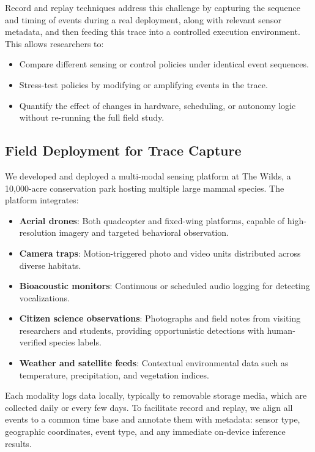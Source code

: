 \documentclass[letterpaper,twocolumn,10pt]{article}
\begin{document}
Record and replay techniques address this challenge by capturing the sequence and timing of events during a real deployment, along with relevant sensor metadata, and then feeding this trace into a controlled execution environment. This allows researchers to:
\begin{itemize}
    \item Compare different sensing or control policies under identical event sequences.
    \item Stress-test policies by modifying or amplifying events in the trace.
    \item Quantify the effect of changes in hardware, scheduling, or autonomy logic without re-running the full field study.
\end{itemize}

\subsection{Field Deployment for Trace Capture}
We developed and deployed a multi-modal sensing platform at The Wilds, a 10{,}000-acre conservation park hosting multiple large mammal species. The platform integrates:
\begin{itemize}
    \item \textbf{Aerial drones}: Both quadcopter and fixed-wing platforms, capable of high-resolution imagery and targeted behavioral observation.
    \item \textbf{Camera traps}: Motion-triggered photo and video units distributed across diverse habitats.
    \item \textbf{Bioacoustic monitors}: Continuous or scheduled audio logging for detecting vocalizations.
    \item \textbf{Citizen science observations}: Photographs and field notes from visiting researchers and students, providing opportunistic detections with human-verified species labels.
    \item \textbf{Weather and satellite feeds}: Contextual environmental data such as temperature, precipitation, and vegetation indices.
\end{itemize}

Each modality logs data locally, typically to removable storage media, which are collected daily or every few days. To facilitate record and replay, we align all events to a common time base and annotate them with metadata: sensor type, geographic coordinates, event type, and any immediate on-device inference results.
\end{document}
